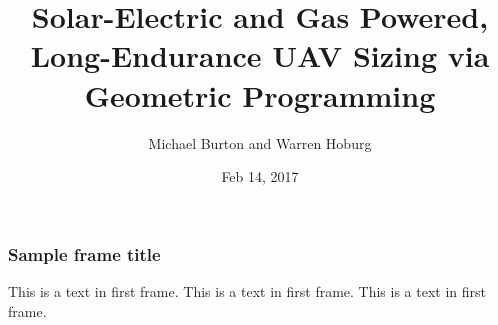 \documentclass{beamer}
\title{Solar-Electric and Gas Powered, Long-Endurance UAV Sizing via Geometric Programming}
\author{Michael Burton and Warren Hoburg}
\institute{Massachusetts Institute of Technology}
\date{Feb 14, 2017}
\begin{document}
 
\frame{\titlepage}
 
\begin{frame}
\frametitle{Sample frame title}
This is a text in first frame. This is a text in first frame. This is a text in first frame.
\end{frame}
 
\end{document}
